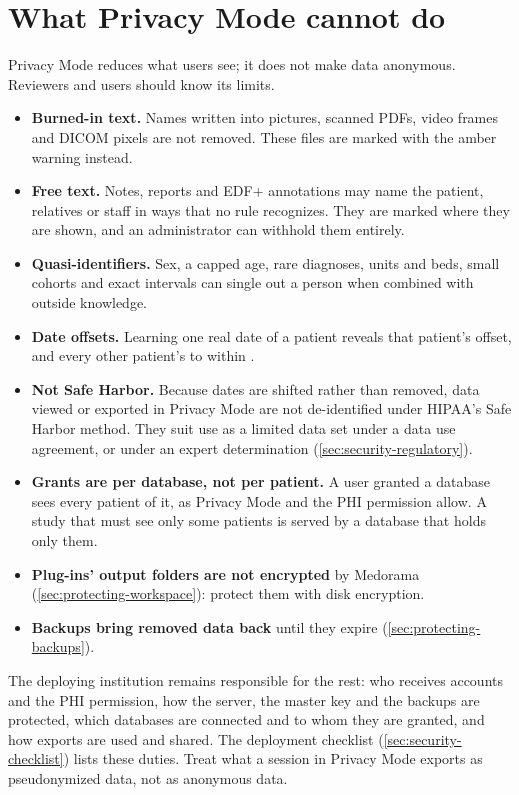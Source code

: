 \section{What Privacy Mode cannot do}
\label{sec:protecting-limits}

Privacy Mode reduces what users see; it does not make data anonymous. Reviewers and users should
know its limits.
\begin{itemize}
\item \textbf{Burned-in text.} Names written into pictures, scanned PDFs, video frames and DICOM
  pixels are not removed. These files are marked with the amber warning instead.
\item \textbf{Free text.} Notes, reports and EDF+ annotations may name the patient, relatives or
  staff in ways that no rule recognizes. They are marked where they are shown, and an
  administrator can withhold them entirely.
\item \textbf{Quasi-identifiers.} Sex, a capped age, rare diagnoses, units and beds, small cohorts
  and exact intervals can single out a person when combined with outside knowledge.
\item \textbf{Date offsets.} Learning one real date of a patient reveals that patient's offset,
  and every other patient's to within .
\item \textbf{Not Safe Harbor.} Because dates are shifted rather than removed, data viewed or
  exported in Privacy Mode are not de-identified under HIPAA's Safe Harbor method. They suit use
  as a limited data set under a data use agreement, or under an expert determination
  (\cref{sec:security-regulatory}).
\item \textbf{Grants are per database, not per patient.} A user granted a database sees every
  patient of it, as Privacy Mode and the PHI permission allow. A study that must see only some
  patients is served by a database that holds only them.
\item \textbf{Plug-ins' output folders are not encrypted} by Medorama
  (\cref{sec:protecting-workspace}): protect them with disk encryption.
\item \textbf{Backups bring removed data back} until they expire (\cref{sec:protecting-backups}).
\end{itemize}

\begin{phibox}
The deploying institution remains responsible for the rest: who receives accounts and the PHI
permission, how the server, the master key and the backups are protected, which databases are
connected and to whom they are granted, and how
exports are used and shared. The deployment checklist (\cref{sec:security-checklist}) lists these
duties. Treat what a session in Privacy Mode exports as pseudonymized data, not as anonymous
data.
\end{phibox}

